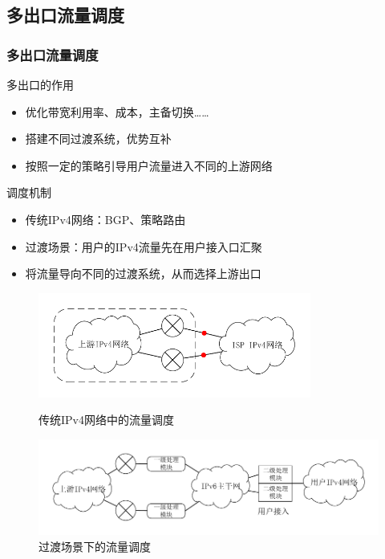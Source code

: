 \documentclass{beamer}
\begin{document}
\subsection{多出口流量调度}
\begin{frame}
  \frametitle{多出口流量调度}

  \begin{block}{多出口的作用}
    \begin{itemize}
    \item 优化带宽利用率、成本，主备切换……
    \item 搭建不同过渡系统，优势互补
    \item 按照一定的策略引导用户流量进入不同的上游网络
    \end{itemize}
  \end{block}

  \begin{block}{调度机制}
    \begin{itemize}
    \item 传统IPv4网络：BGP、策略路由
    \item 过渡场景：用户的IPv4流量先在用户接入口汇聚
    \item 将流量导向不同的过渡系统，从而选择上游出口
    \end{itemize}
  \end{block}
\end{frame}

\begin{frame}
  \begin{figure}
    \vspace{-1em}
    \includegraphics[width=0.8\textwidth]{figs/20-ipv4-multi-egress.pdf}
    \vspace{-2em}
    \caption{\tiny 传统IPv4网络中的流量调度}
    \vspace{-1em}
    \includegraphics[width=\textwidth]{figs/21-ipv6-multi-egress.pdf}
    \vspace{-2em}
    \caption{\tiny 过渡场景下的流量调度}
  \end{figure}
\end{frame}
\end{document}
